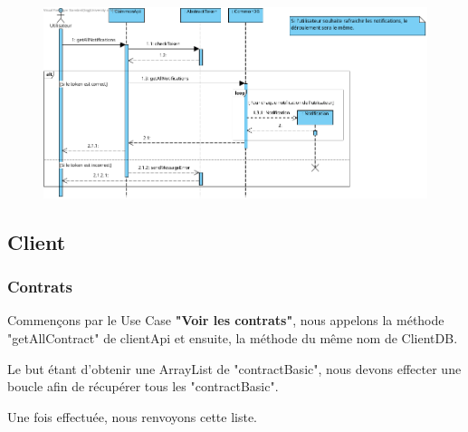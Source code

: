 \begin{figure}[h]
\centering
\includegraphics[height = 1\textwidth]{Base/sequence/img/common/Voir notifications.png}
\end{figure}

\newpage
\subsection{Client}

\subsubsection{Contrats}\label{CONTRATS}

\begin{flushleft}
Commençons par le Use Case \textbf{"Voir les contrats"}, nous appelons la méthode "getAllContract" de clientApi et ensuite, la méthode du même nom de ClientDB.
\end{flushleft}

\begin{flushleft}
Le but étant d'obtenir une ArrayList de "contractBasic", nous devons effecter une boucle afin de récupérer tous les "contractBasic".
\end{flushleft}

\begin{flushleft}
Une fois effectuée, nous renvoyons cette liste.
\end{flushleft}

